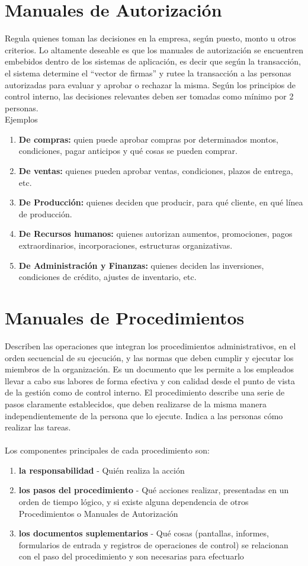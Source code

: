 \documentclass[12pt]{book}
\begin{document}
\section{Manuales de Autorización}
Regula quienes toman las decisiones en la empresa, según puesto, monto u otros criterios. Lo altamente deseable
es que los manuales de autorización se encuentren embebidos dentro de los sistemas de aplicación, es decir que
según la transacción, el sistema determine el “vector de firmas” y rutee la transacción a las personas autorizadas
para evaluar y aprobar o rechazar la misma.
Según los principios de control interno, las decisiones relevantes deben ser tomadas como mínimo por 2 personas. \\
Ejemplos
	\begin{enumerate}
		\item		\textbf{De compras:} quien puede aprobar compras por determinados montos, condiciones, pagar anticipos y qué cosas se pueden comprar.
		\item		\textbf{De ventas:} quienes pueden aprobar ventas, condiciones, plazos de entrega, etc.
		\item		\textbf{De Producción:} quienes deciden que producir, para qué cliente, en qué línea de producción.
		\item		\textbf{De Recursos humanos:} quienes autorizan aumentos, promociones, pagos extraordinarios,
		incorporaciones, estructuras organizativas.
		\item		\textbf{De Administración y Finanzas:} quienes deciden las inversiones, condiciones de crédito, ajustes de
		inventario, etc.
	\end{enumerate}
\section{Manuales de Procedimientos}
Describen las operaciones que integran los procedimientos administrativos, en el orden secuencial de su ejecución,
y las normas que deben cumplir y ejecutar los miembros de la organización. Es un documento que les permite a los
empleados llevar a cabo sus labores de forma efectiva y con calidad desde el punto de vista de la gestión como de
control interno.
El procedimiento describe una serie de pasos claramente establecidos, que deben realizarse de la misma manera
independientemente de la persona que lo ejecute. Indica a las personas cómo realizar las tareas.\\ \\
Los componentes principales de cada procedimiento son:
\begin{enumerate}
	\item \textbf{la responsabilidad} - Quién realiza la acción
	\item \textbf{los pasos del procedimiento} - Qué acciones realizar, presentadas en un orden de tiempo lógico, y si existe
alguna dependencia de otros Procedimientos o Manuales de Autorización
		\item \textbf{los documentos suplementarios} - Qué cosas (pantallas, informes, formularios de entrada y registros de
operaciones de control) se relacionan con el paso del procedimiento y son necesarias para efectuarlo
\end{enumerate}
\end{document}
